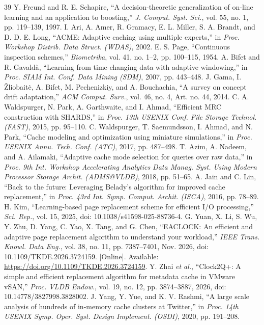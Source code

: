 \documentclass[10pt,twocolumn]{article}
\begin{document}
\begin{thebibliography}{39}
 Y. Freund and R. E. Schapire, ``A decision-theoretic generalization of on-line learning and an application to boosting,'' \emph{J. Comput. Syst. Sci.}, vol. 55, no. 1, pp. 119--139, 1997.
 I. Ari, A. Amer, R. Gramacy, E. L. Miller, S. A. Brandt, and D. D. E. Long, ``ACME: Adaptive caching using multiple experts,'' in \emph{Proc. Workshop Distrib. Data Struct. (WDAS)}, 2002.
 E. S. Page, ``Continuous inspection schemes,'' \emph{Biometrika}, vol. 41, no. 1--2, pp. 100--115, 1954.
 A. Bifet and R. Gavald\`{a}, ``Learning from time-changing data with adaptive windowing,'' in \emph{Proc. SIAM Int. Conf. Data Mining (SDM)}, 2007, pp. 443--448.
 J. Gama, I. \v{Z}liobait\.{e}, A. Bifet, M. Pechenizkiy, and A. Bouchachia, ``A survey on concept drift adaptation,'' \emph{ACM Comput. Surv.}, vol. 46, no. 4, Art. no. 44, 2014.
 C. A. Waldspurger, N. Park, A. Garthwaite, and I. Ahmad, ``Efficient MRC construction with SHARDS,'' in \emph{Proc. 13th USENIX Conf. File Storage Technol. (FAST)}, 2015, pp. 95--110.
 C. Waldspurger, T. Saemundsson, I. Ahmad, and N. Park, ``Cache modeling and optimization using miniature simulations,'' in \emph{Proc. USENIX Annu. Tech. Conf. (ATC)}, 2017, pp. 487--498.
 T. Azim, A. Nadeem, and A. Ailamaki, ``Adaptive cache mode selection for queries over raw data,'' in \emph{Proc. 9th Int. Workshop Accelerating Analytics Data Manag. Syst. Using Modern Processor Storage Archit. (ADMS@VLDB)}, 2018, pp. 51--65.
 A. Jain and C. Lin, ``Back to the future: Leveraging Belady's algorithm for improved cache replacement,'' in \emph{Proc. 43rd Int. Symp. Comput. Archit. (ISCA)}, 2016, pp. 78--89.
 H. Kim, ``Learning-based page replacement scheme for efficient I/O processing,'' \emph{Sci. Rep.}, vol. 15, 2025, doi: 10.1038/s41598-025-88736-4.
 G. Yuan, X. Li, S. Wu, Y. Zhu, D. Yang, C. Yao, X. Tang, and G. Chen, ``EACLOCK: An efficient and adaptive page replacement algorithm to understand your workload,'' \emph{IEEE Trans. Knowl. Data Eng.}, vol. 38, no. 11, pp. 7387--7401, Nov. 2026, doi: 10.1109/TKDE.2026.3724159. [Online]. Available: \url{https://doi.org/10.1109/TKDE.2026.3724159}.
 Y. Zhai \emph{et al.}, ``Clock2Q+: A simple and efficient replacement algorithm for metadata cache in VMware vSAN,'' \emph{Proc. VLDB Endow.}, vol. 19, no. 12, pp. 3874--3887, 2026, doi: 10.14778/3827998.3828002.
 J. Yang, Y. Yue, and K. V. Rashmi, ``A large scale analysis of hundreds of in-memory cache clusters at Twitter,'' in \emph{Proc. 14th USENIX Symp. Oper. Syst. Design Implement. (OSDI)}, 2020, pp. 191--208.

\end{thebibliography}
\end{document}
